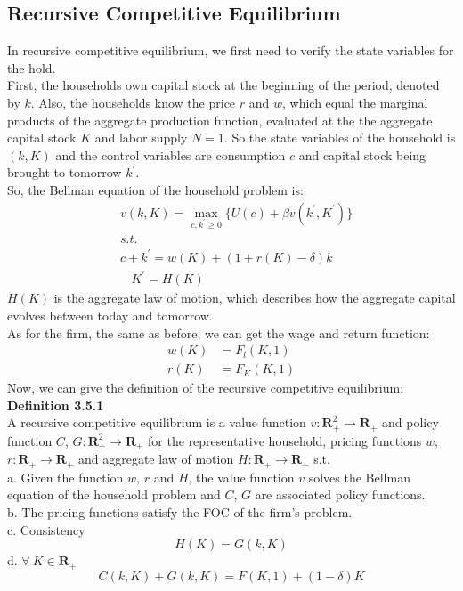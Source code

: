 \documentclass{article}
\begin{document}
\subsection{Recursive Competitive Equilibrium}
In recursive competitive equilibrium, we first need to verify the state variables for the hold.\\
First, the households own capital stock at the beginning of the period, denoted by $k$. Also, the households know the price $r$ and $w$, which equal the marginal products of the aggregate production function, evaluated at the the aggregate capital stock $K$ and labor supply $N = 1$. So the state variables of the household is $(k, K)$ and the control variables are consumption $c$ and capital stock being brought to tomorrow $k^\prime$.\\
So, the Bellman equation of the household problem is:
\begin{align*}
	&v(k, K) = \mathop{max}\limits_{c, k^\prime \geq 0} \{U(c) + \beta v(k^\prime, K^\prime)\}\\
	&s.t.\\
	& c + k^\prime = w(K) + (1 + r(K) - \delta)k\\
	&\ \ \ \  K^\prime = H(K) 
\end{align*}
$H(K)$ is the aggregate law of motion, which describes how the aggregate capital evolves between today and tomorrow.\\
As for the firm, the same as before, we can get the wage and return function:
\begin{align*}
	w(K) &= F_l(K, 1)\\
	r(K) &= F_K(K, 1)
\end{align*}
Now, we can give the definition of the recursive competitive equilibrium:\\
\textbf{Definition 3.5.1}\\
A recursive competitive equilibrium is a value function $v: \textbf{R}^2_+ \to \textbf{R}_+$ and policy function $C$, $G: \textbf{R}^2_+ \to \textbf{R}_+$ for the representative household, pricing functions $w$, $r: \textbf{R}_+ \to \textbf{R}_+$ and aggregate law of motion $H: \textbf{R}_+ \to \textbf{R}_+$ s.t.\\
\indent a. Given the function $w$, $r$ and $H$, the value function $v$ solves the Bellman equation of the household problem and $C$, $G$ are associated policy functions.\\
\indent b. The pricing functions satisfy the FOC of the firm's problem.\\
\indent c. Consistency
\begin{equation*}
	H(K) = G(k, K)
\end{equation*}
\indent d. $\forall\ K \in \textbf{R}_+$
\begin{equation*}
	C(k, K) + G(k, K) = F(K, 1) + (1 - \delta)K
\end{equation*}
\end{document}
